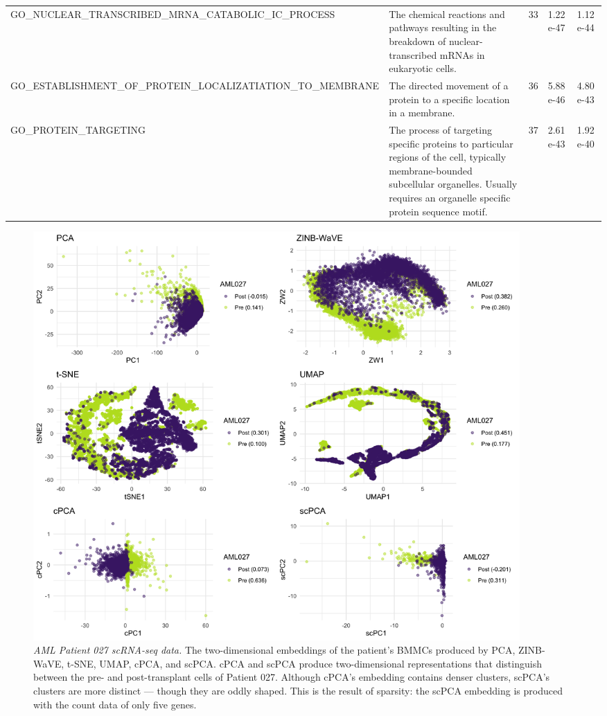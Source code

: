 \documentclass{article}
\begin{document}
\begin{table}
\begin{tabular}{|p{5cm} | p{6cm} | p{1.5cm} | p{1.5cm} | p{1.5cm}|}
  GO\_NUCLEAR\_TRANSCRIBED\_MRNA\_CATABOLIC\newline\_IC\_PROCESS & The chemical reactions and pathways resulting in the breakdown of nuclear-transcribed mRNAs in eukaryotic cells. & 33 & 1.22 e-47 & 1.12 e-44 \\
  GO\_ESTABLISHMENT\_OF\_PROTEIN\_LOCALIZATIATION\_TO\_MEMBRANE & The directed movement of a protein to a specific location in a membrane. & 36 & 5.88 e-46 & 4.80 e-43 \\
  GO\_PROTEIN\_TARGETING & The process of targeting specific proteins to particular regions of the cell, typically membrane-bounded subcellular organelles. Usually requires an organelle specific protein sequence motif. & 37 & 2.61 e-43 & 1.92 e-40 \\
 \hline
\end{tabular}
\label{tab:gsea_aml035}
\end{table}


\begin{figure}[!htbp]
  \centering
  \includegraphics[width=0.9\textwidth]{figures/aml027_results}
  \caption{
  {\em AML Patient 027 scRNA-seq data.} The two-dimensional embeddings of the patient's BMMCs produced by PCA, ZINB-WaVE, t-SNE, UMAP, cPCA, and scPCA. cPCA and scPCA produce two-dimensional representations that distinguish between the pre- and post-transplant cells of Patient 027. Although cPCA's embedding contains denser clusters, scPCA's clusters are more distinct --- though they are oddly shaped. This is the result of sparsity: the scPCA embedding is produced with the count data of only five genes.}
  \label{fig:comp_leuk_pat2}
\end{figure}
\end{document}
